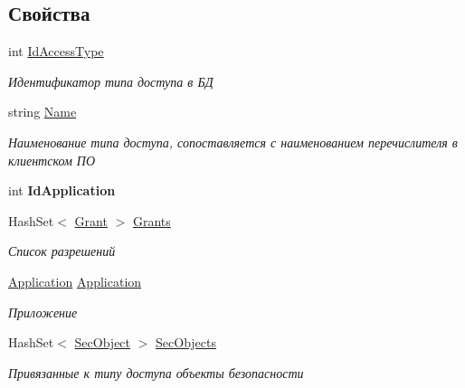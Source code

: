 \subsection*{Свойства}
\begin{DoxyCompactItemize}
\item 
int \hyperlink{class_security_1_1_model_1_1_access_type_a063f312592e86d43b87321c94ee1356a}{Id\+Access\+Type}
\begin{DoxyCompactList}\small\item\em Идентификатор типа доступа в БД \end{DoxyCompactList}\item 
string \hyperlink{class_security_1_1_model_1_1_access_type_aedfe5970aec5df6c5752f917f7d80641}{Name}
\begin{DoxyCompactList}\small\item\em Наименование типа доступа, сопоставляется с наименованием перечислителя в клиентском ПО \end{DoxyCompactList}\item 
\mbox{\label{class_security_1_1_model_1_1_access_type_aa74e02bbc2e6bc7e0802c1570da6a983}} 
int {\bfseries Id\+Application}
\item 
Hash\+Set$<$ \hyperlink{class_security_1_1_model_1_1_grant}{Grant} $>$ \hyperlink{class_security_1_1_model_1_1_access_type_aa24c2432d288d76e72ecc1cf6eb885a3}{Grants}
\begin{DoxyCompactList}\small\item\em Список разрешений \end{DoxyCompactList}\item 
\hyperlink{class_security_1_1_model_1_1_application}{Application} \hyperlink{class_security_1_1_model_1_1_access_type_a550eb30ec9e7a4b3e01329614d43dcad}{Application}
\begin{DoxyCompactList}\small\item\em Приложение \end{DoxyCompactList}\item 
Hash\+Set$<$ \hyperlink{class_security_1_1_model_1_1_sec_object}{Sec\+Object} $>$ \hyperlink{class_security_1_1_model_1_1_access_type_aad9c922e320edaf15f2f4d74a0b2ecfa}{Sec\+Objects}
\begin{DoxyCompactList}\small\item\em Привязанные к типу доступа объекты безопасности \end{DoxyCompactList}\end{DoxyCompactItemize}


